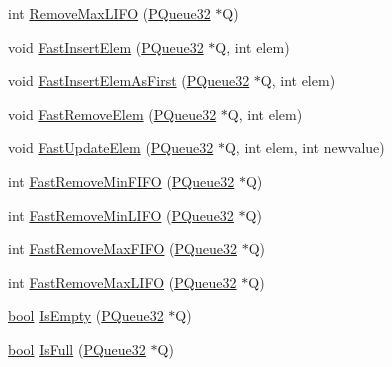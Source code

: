 \begin{DoxyCompactItemize}
\item 
int \hyperlink{namespacegft_1_1PQueue32_ac60665e66550803e6c833dbf2f5c1326}{Remove\-Max\-L\-I\-F\-O} (\hyperlink{namespacegft_1_1PQueue32_a27686e3155a7097ff40a4e88958bb50e}{P\-Queue32} $\ast$Q)
\item 
void \hyperlink{namespacegft_1_1PQueue32_ab5bae54bfd6b5bbce3b3e80152d58e87}{Fast\-Insert\-Elem} (\hyperlink{namespacegft_1_1PQueue32_a27686e3155a7097ff40a4e88958bb50e}{P\-Queue32} $\ast$Q, int elem)
\item 
void \hyperlink{namespacegft_1_1PQueue32_ae89deb12c29cee56c57bd96eeeb959a9}{Fast\-Insert\-Elem\-As\-First} (\hyperlink{namespacegft_1_1PQueue32_a27686e3155a7097ff40a4e88958bb50e}{P\-Queue32} $\ast$Q, int elem)
\item 
void \hyperlink{namespacegft_1_1PQueue32_ad7a98035b23b3eba7e0c81489d3c2cd8}{Fast\-Remove\-Elem} (\hyperlink{namespacegft_1_1PQueue32_a27686e3155a7097ff40a4e88958bb50e}{P\-Queue32} $\ast$Q, int elem)
\item 
void \hyperlink{namespacegft_1_1PQueue32_a9cb2321bf551da3e5e9358e12ed9ce40}{Fast\-Update\-Elem} (\hyperlink{namespacegft_1_1PQueue32_a27686e3155a7097ff40a4e88958bb50e}{P\-Queue32} $\ast$Q, int elem, int newvalue)
\item 
int \hyperlink{namespacegft_1_1PQueue32_ad1bfef2403acda7b6f75b2ebcd77b661}{Fast\-Remove\-Min\-F\-I\-F\-O} (\hyperlink{namespacegft_1_1PQueue32_a27686e3155a7097ff40a4e88958bb50e}{P\-Queue32} $\ast$Q)
\item 
int \hyperlink{namespacegft_1_1PQueue32_acc6f5f1e9f2fc877d4248d7011cd0a80}{Fast\-Remove\-Min\-L\-I\-F\-O} (\hyperlink{namespacegft_1_1PQueue32_a27686e3155a7097ff40a4e88958bb50e}{P\-Queue32} $\ast$Q)
\item 
int \hyperlink{namespacegft_1_1PQueue32_a23d1692d12a325509c600e1f2d524dcd}{Fast\-Remove\-Max\-F\-I\-F\-O} (\hyperlink{namespacegft_1_1PQueue32_a27686e3155a7097ff40a4e88958bb50e}{P\-Queue32} $\ast$Q)
\item 
int \hyperlink{namespacegft_1_1PQueue32_a0380ab8c771144afb74bcf072219066f}{Fast\-Remove\-Max\-L\-I\-F\-O} (\hyperlink{namespacegft_1_1PQueue32_a27686e3155a7097ff40a4e88958bb50e}{P\-Queue32} $\ast$Q)
\item 
\hyperlink{namespacegft_a033dba4822661600b08d2bbf16879252}{bool} \hyperlink{namespacegft_1_1PQueue32_abca961d6e7d640423191f61c45f53143}{Is\-Empty} (\hyperlink{namespacegft_1_1PQueue32_a27686e3155a7097ff40a4e88958bb50e}{P\-Queue32} $\ast$Q)
\item 
\hyperlink{namespacegft_a033dba4822661600b08d2bbf16879252}{bool} \hyperlink{namespacegft_1_1PQueue32_af3600f33c9ad56ae1e8a6a7cac1adc06}{Is\-Full} (\hyperlink{namespacegft_1_1PQueue32_a27686e3155a7097ff40a4e88958bb50e}{P\-Queue32} $\ast$Q)
\end{DoxyCompactItemize}


